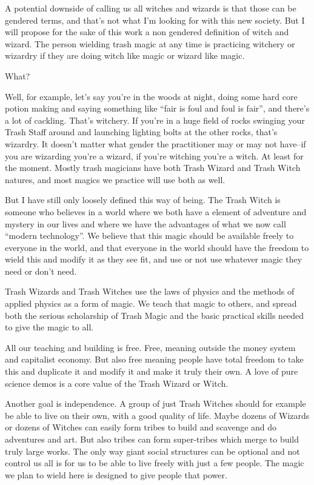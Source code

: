 A potential downside of calling us all witches and wizards is that those
can be gendered terms, and that's not what I'm looking for with this new
society. But I will propose for the sake of this work a non gendered
definition of witch and wizard. The person wielding trash magic at any
time is practicing witchery or wizardry if they are doing witch like
magic or wizard like magic.

What?

Well, for example, let's say you're in the woods at night, doing some
hard core potion making and saying something like ``fair is foul and
foul is fair'', and there's a lot of cackling. That's witchery. If
you're in a huge field of rocks swinging your Trash Staff around and
launching lighting bolts at the other rocks, that's wizardry. It doesn't
matter what gender the practitioner may or may not have--if you are
wizarding you're a wizard, if you're witching you're a witch. At least
for the moment. Mostly trash magicians have both Trash Wizard and Trash
Witch natures, and most magics we practice will use both as well.

But I have still only loosely defined this way of being. The Trash Witch
is someone who believes in a world where we both have a element of
adventure and mystery in our lives and where we have the advantages of
what we now call ``modern technology''. We believe that this magic
should be available freely to everyone in the world, and that everyone
in the world should have the freedom to wield this and modify it as they
see fit, and use or not use whatever magic they need or don't need.

Trash Wizards and Trash Witches use the laws of physics and the methods
of applied physics as a form of magic. We teach that magic to others,
and spread both the serious scholarship of Trash Magic and the basic
practical skills needed to give the magic to all.

All our teaching and building is free. Free, meaning outside the money
system and capitalist economy. But also free meaning people have total
freedom to take this and duplicate it and modify it and make it truly
their own. A love of pure science demos is a core value of the Trash
Wizard or Witch.

Another goal is independence. A group of just Trash Witches should for
example be able to live on their own, with a good quality of life. Maybe
dozens of Wizards or dozens of Witches can easily form tribes to build
and scavenge and do adventures and art. But also tribes can form
super-tribes which merge to build truly large works. The only way giant
social structures can be optional and not control us all is for us to be
able to live freely with just a few people. The magic we plan to wield
here is designed to give people that power.

